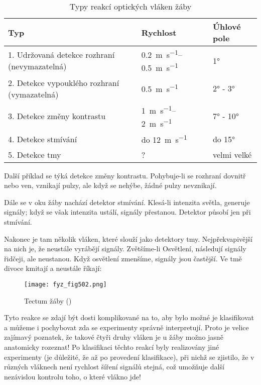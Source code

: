     \begin{table*}[hb!]
      \begin{tabular}{@{}lll@{}}
      \toprule
        \textbf{Typ}                                  & \textbf{Rychlost}            & \textbf{Úhlové pole} \\ \midrule
        1. Udržovaná detekce rozhraní (nevymazatelná) & \SIrange{0.2}{0.5}{\m\per\s} & \ang{1}              \\
        2. Detekce vypouklého rozhraní (vymazatelná)  & \SI{0.5}{\m\per\s}           & \ang{2} - \ang{3}    \\
        3. Detekce změny kontrastu                    & \SIrange{1}{2}{\m\per\s}     & \ang{7} - \ang{10}   \\
        4. Detekce stmívání                           & do \SI{12}{\m\per\s}         & do \ang{15}          \\
        5. Detekce tmy                                & ?                            & velmi velké          \\ \bottomrule
      \end{tabular}
      \caption{Typy reakcí optických vláken žáby}
    \end{table*}

    Další příklad se týká detekce změny kontrastu. Pohybuje-li se rozhraní dovnitř nebo ven,
    vznikají pulzy, ale když se nehýbe, žádné pulzy nevznikají. 
    
    Dále se v oku žáby nachází detektor stmívání. Klesá-li intenzita světla, generuje signály; když
    se však intenzita ustálí, signály přestanou. Detektor působí jen při stmívání.

    Nakonec je tam několik vláken, které slouží jako detektory tmy. Nejpřekvapivější na nich je, že
    neustále vyrábějí signály. Zvětšíme-li Osvětlení, následují signály řidčeji, ale neustanou. Když
    osvětlení zmenšíme, signály jsou častější. Ve tmě divoce kmitají a neustále říkají: 

    \begin{figure}[ht!] %
      \centering
      \texttt{[image: fyz\_fig502.png]}
      \caption{Tectum žáby (\cite[s.~697]{Feynman01})}
      \label{fyz:fig502}
    \end{figure}

    Tyto reakce se zdají být dosti komplikované na to, aby bylo možné je klasifikovat a můžeme i
    pochybovat zda se experimenty správně interpretují. Proto je velice zajímavý poznatek, že takové
    čtyři druhy vláken je u žáby možno jasně anatomicky rozeznat! Po klasifikaci těchto reakcí byly
    realizovány jiné experimenty (je důležité, že až po provedení klasifikace), při nichž se
    zjistilo, že v různých vláknech není rychlost šíření signálů stejná, což umožňuje další
    nezávislou kontrolu toho, o které vlákno jde!
    
